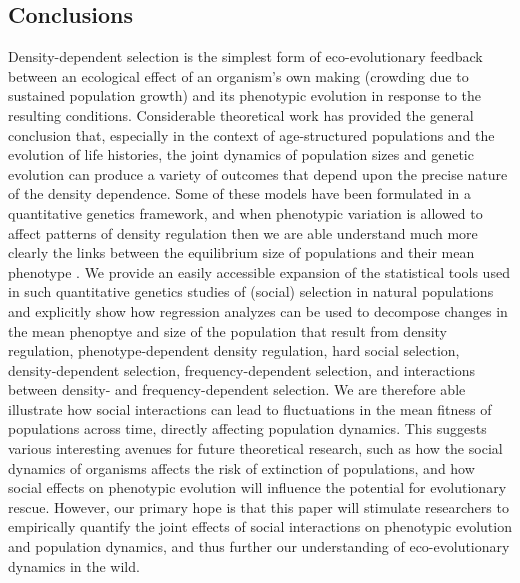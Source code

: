 \documentclass{article}
\begin{document}
\subsection{Conclusions}
Density-dependent selection is the simplest form of eco-evolutionary feedback between an ecological effect of an organism’s own making (crowding due to sustained population growth) and its phenotypic evolution in response to the resulting conditions. Considerable theoretical work has provided the general conclusion that, especially in the context of age-structured populations and the evolution of life histories, the joint dynamics of population sizes and genetic evolution can produce a variety of outcomes that depend upon the precise nature of the density dependence. Some of these models have been formulated in a quantitative genetics framework, and when phenotypic variation is allowed to affect patterns of density regulation then we are able understand much more clearly the links between the equilibrium size of populations and their mean phenotype \citep{Engen2020}. We provide an easily accessible expansion of the statistical tools used in such quantitative genetics studies of (social) selection in natural populations and explicitly show how regression analyzes can be used to decompose changes in the mean phenoptye and size of the population that result from density regulation, phenotype-dependent density regulation, hard social selection, density-dependent selection, frequency-dependent selection, and interactions between density- and frequency-dependent selection. We are therefore able illustrate how social interactions can lead to fluctuations in the mean fitness of populations across time, directly affecting population dynamics. This suggests various interesting avenues for future theoretical research, such as how the social dynamics of organisms affects the risk of extinction of populations, and how social effects on phenotypic evolution will influence the potential for evolutionary rescue. However, our primary hope is that this paper will stimulate researchers to empirically quantify the joint effects of social interactions on phenotypic evolution and population dynamics, and thus further our understanding of eco-evolutionary dynamics in the wild.



  
\end{document}
